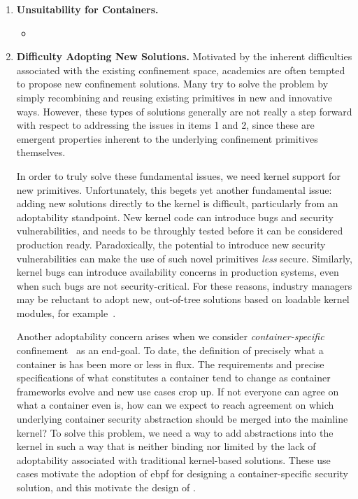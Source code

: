 \begin{enumerate}[font=\bfseries]
  \item \textbf{Unsuitability for Containers.}
  \begin{inprogress}
    \begin{itemize}
      \item
    \end{itemize}
  \end{inprogress}

  \item \textbf{Difficulty Adopting New Solutions.}
    Motivated by the inherent difficulties associated with the existing confinement space,
    academics are often tempted to propose new confinement solutions. Many try to solve
    the problem by simply recombining and reusing existing primitives in new and
    innovative ways.  However, these types of solutions generally are not really a step
    forward with respect to addressing the issues in items 1 and 2, since these are
    emergent properties inherent to the underlying confinement primitives themselves.

    In order to truly solve these fundamental issues, we need kernel support for new
    primitives. Unfortunately, this begets yet another fundamental issue: adding new
    solutions directly to the kernel is difficult, particularly from an adoptability
    standpoint. New kernel code can introduce bugs and security vulnerabilities, and needs
    to be throughly tested before it can be considered production ready. Paradoxically,
    the potential to introduce new security vulnerabilities can make the use of such novel
    primitives \textit{less} secure. Similarly, kernel bugs can introduce availability
    concerns in production systems, even when such bugs are not security-critical. For
    these reasons, industry managers may be reluctant to adopt new, out-of-tree solutions
    based on loadable kernel modules, for example~\cite{gregg2019_bpf}.

    Another adoptability concern arises when we consider \textit{container-specific}
    confinement~\cite{sultan2019_container_security, sun2018_security_namespace} as an
    end-goal.  To date, the definition of precisely what a container is has been more or
    less in flux. The requirements and precise specifications of what constitutes
    a container tend to change as container frameworks evolve and new use cases crop up.
    If not everyone can agree on what a container even is, how can we expect to reach
    agreement on which underlying container security abstraction should be merged into the
    mainline kernel? To solve this problem, we need a way to add abstractions into the
    kernel in such a way that is neither binding nor limited by the lack of adoptability
    associated with traditional kernel-based solutions. These use cases motivate the
    adoption of \gls{ebpf} for designing a container-specific security solution, and this
    motivate the design of \bpfcontain{}.
\end{enumerate}



